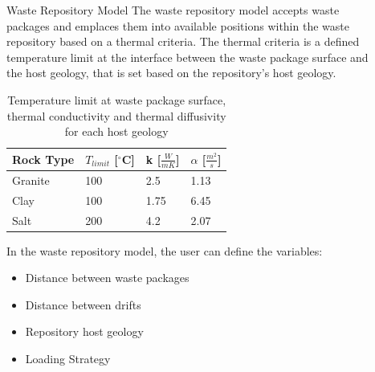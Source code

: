 \documentclass[final]{beamer}
\newlength{\sepwid}
\newlength{\onecolwid}
\newlength{\threecolwid}
\begin{document}
\begin{frame}[t]
\begin{columns}[t,totalwidth=\threecolwid]
\begin{column}{\onecolwid}

\end{column} %

\begin{column}{\sepwid}\end{column} %



\begin{column}{\onecolwid} %

\begin{block}{Waste Repository Model}
The waste repository model accepts waste packages and emplaces them into 
available positions within the waste repository based on a thermal criteria.  
The thermal criteria is a defined temperature limit at the interface between the waste 
package surface and the host geology, that is set based on the repository's host geology.

\begin{table}[]
	\label{tab:temp_limit}
	\caption{Temperature limit at waste package surface, thermal conductivity 
	and thermal diffusivity for each host geology \cite{sutton_investigations_2011}}
	\begin{tabular}{|l|l|l|l|}
	\hline
	Rock Type & $T_{limit}$ [$^\circ$C] & k [$\frac{W}{mK}$] &  $\alpha$ [$\frac{m^2}{s}$]  \\ \hline
	Granite   & 100 & 2.5  & 1.13\\ \hline
	Clay      & 100 & 1.75 & 6.45\\ \hline
	Salt      & 200 & 4.2  & 2.07\\ \hline
	\end{tabular}
\end{table}

In the waste repository model, the user can define the variables: 
	\begin{itemize}
		\item Distance between waste packages
		\item Distance between drifts 
		\item Repository host geology 
		\item Loading Strategy 
	\end{itemize}


\end{block}
\end{column}
\end{columns}
\end{frame}
\end{document}
